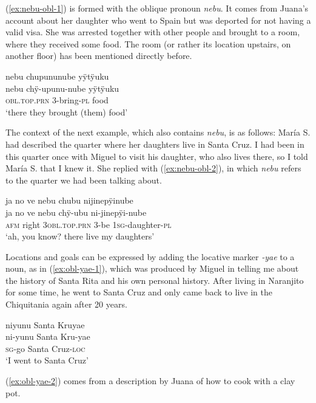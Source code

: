 (\ref{ex:nebu-obl-1}) is formed with the oblique pronoun \textit{nebu}. It comes from Juana’s account about her daughter who went to Spain but was deported for not having a valid visa. She was arrested together with other people and brought to a room, where they received some food. The room (or rather its location upstairs, on another floor) has been mentioned directly before.

\ea\label{ex:nebu-obl-1}
\begingl
\glpreamble nebu chupununube yÿtÿuku\\
\gla nebu chÿ-upunu-nube yÿtÿuku\\
\textsc{obl.top.prn} 3-bring-\textsc{pl} food\\
\glft ‘there they brought (them) food’
\endgl
\trailingcitation{[jxx-p110923l-1.314]}
\xe

The context of the next example, which also contains \textit{nebu}, is as follows: María S. had described the quarter where her daughters live in Santa Cruz. I had been in this quarter once with Miguel to visit his daughter, who also lives there, so I told María S. that I knew it. She replied with (\ref{ex:nebu-obl-2}), in which \textit{nebu} refers to the quarter we had been talking about.

\ea\label{ex:nebu-obl-2}
\begingl
\glpreamble ja no ve nebu chubu nijinepÿinube\\
\gla ja {no ve} nebu chÿ-ubu ni-jinepÿi-nube\\
\glb \textsc{afm} {right} 3\textsc{obl.top.prn} 3-be 1\textsc{sg}-daughter-\textsc{pl}\\
\glft ‘ah, you know? there live my daughters’
\endgl
\trailingcitation{[rxx-e120511l.256]}
\xe

Locations and goals can be expressed by adding the locative marker \textit{-yae} to a noun, as in (\ref{ex:obl-yae-1}), which was produced by Miguel in telling me about the history of Santa Rita and his own personal history. After living in Naranjito for some time, he went to Santa Cruz and only came back to live in the Chiquitania again after 20 years.

\ea\label{ex:obl-yae-1}
\begingl
\glpreamble niyunu Santa Kruyae\\
\gla ni-yunu {Santa Kru}-yae\\
\textsc{sg}-go {Santa Cruz}-\textsc{loc}\\
\glft ‘I went to Santa Cruz’
\endgl
\trailingcitation{[mxx-p110825l.074]}
\xe

(\ref{ex:obl-yae-2}) comes from a description by Juana of how to cook with a clay pot. 

